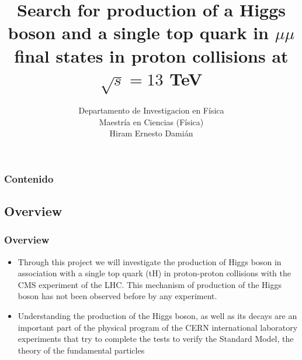 \documentclass[11pt]{beamer}
\begin{document}
	\author{
		Departamento de Investigacion en F\'isica \\
		Maestría en Ciencias (Física)\\
		Hiram Ernesto Dami\'an}
	\title{Search for production of a Higgs boson and a single top quark in $\mu\mu$ final states in proton collisions at $\sqrt{s}=13$ TeV}
	\newcommand{\subf}[2]{%
		{\small\begin{tabular}[t]{@{}c@{}}
				#1\\#2
		\end{tabular}}%
	}
	\begin{frame}
	\titlepage
\end{frame}

\begin{frame}
\tableofcontents
\frametitle{Contenido}
\end{frame}


\begin{frame}
\section{Overview}
\frametitle{Overview}
\begin{itemize}
\item Through this project we will investigate the production of Higgs boson in association with a
single top quark (tH) in proton-proton collisions with the CMS experiment of the LHC. This
mechanism of production of the Higgs boson has not been observed before by any
experiment.

\item Understanding the production of the Higgs boson, as well as its decays are an important part
of the physical program of the CERN international laboratory experiments that try to complete
the tests to verify the Standard Model, the theory of the fundamental particles

\end{itemize}
\end{frame}
\end{document}
